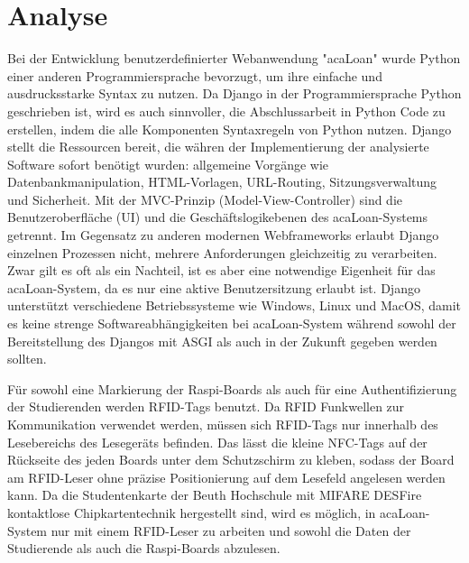 \chapter{Analyse}
\label{sec:analyse}
Bei der Entwicklung benutzerdefinierter Webanwendung "acaLoan" wurde Python einer anderen Programmiersprache bevorzugt, um ihre einfache und ausdrucksstarke Syntax zu nutzen. Da Django in der Programmiersprache Python geschrieben ist, wird es auch sinnvoller, die Abschlussarbeit in Python Code zu erstellen, indem die alle Komponenten Syntaxregeln von Python nutzen. Django stellt die Ressourcen bereit, die währen der Implementierung der analysierte Software sofort benötigt wurden: allgemeine Vorgänge wie Datenbankmanipulation, HTML-Vorlagen, URL-Routing, Sitzungsverwaltung und Sicherheit. Mit der MVC-Prinzip (Model-View-Controller) sind die Benutzeroberfläche (UI) und die Geschäftslogikebenen des acaLoan-Systems getrennt. Im Gegensatz zu anderen modernen Webframeworks erlaubt Django einzelnen Prozessen nicht, mehrere Anforderungen gleichzeitig zu verarbeiten. Zwar gilt es oft als ein Nachteil, ist es aber eine notwendige Eigenheit für das acaLoan-System, da es nur eine aktive Benutzersitzung erlaubt ist. Django unterstützt verschiedene Betriebssysteme wie Windows, Linux und MacOS, damit es keine strenge Softwareabhängigkeiten bei acaLoan-System während sowohl der Bereitstellung des Djangos mit ASGI als auch in der Zukunft gegeben werden sollten. 

Für sowohl eine Markierung der Raspi-Boards als auch für eine Authentifizierung der Studierenden werden RFID-Tags benutzt. Da RFID Funkwellen zur Kommunikation verwendet werden, müssen sich RFID-Tags nur innerhalb des Lesebereichs des Lesegeräts befinden. Das lässt die kleine NFC-Tags auf der Rückseite des jeden Boards unter dem Schutzschirm zu kleben, sodass der Board am RFID-Leser ohne präzise Positionierung auf dem Lesefeld angelesen werden kann. Da die Studentenkarte der Beuth Hochschule mit MIFARE DESFire kontaktlose Chipkartentechnik hergestellt sind, wird es möglich, in acaLoan-System nur mit einem RFID-Leser zu arbeiten und sowohl die Daten der Studierende als auch die Raspi-Boards abzulesen. 

